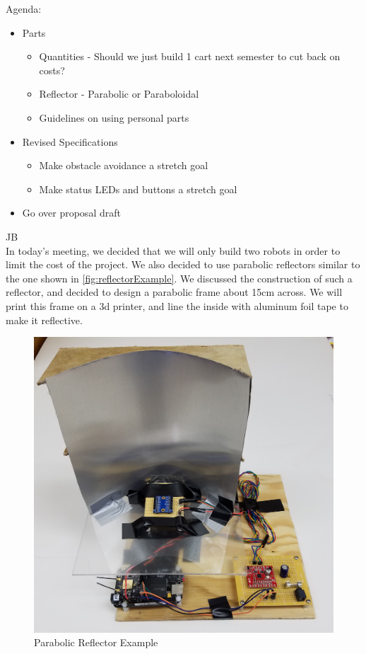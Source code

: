 \documentclass[fontsize=11pt, %
                             paper=letter, %
                             openany, %
                             captions=tableheading,
                             index=totoc,
                             hyperref]{labbook}
\begin{document}
\begin{addmargin}[0cm]{0cm}
Agenda: 
\begin{itemize}
    \item Parts
    \begin{itemize}
        \item Quantities - Should we just build 1 cart next semester to cut back on costs?
        \item Reflector - Parabolic or Paraboloidal
        \item Guidelines on using personal parts
    \end{itemize}
    \item Revised Specifications
    \begin{itemize}
        \item Make obstacle avoidance a stretch goal
        \item Make status LEDs and buttons a stretch goal
    \end{itemize}
    \item Go over proposal draft
\end{itemize}

JB\\
In today's meeting, we decided that we will only build two robots in order to limit the cost of the project. We also decided to use parabolic reflectors similar to the one shown in \autoref{fig:reflectorExample}. We discussed the construction of such a reflector, and decided to design a parabolic frame about 15cm across. We will print this frame on a 3d printer, and line the inside with aluminum foil tape to make it reflective.

\begin{figure}[h!]
    \centering
    \includegraphics[width=4.5in]{figs/img/customizedRadioTransceiver}
    \caption{Parabolic Reflector Example}
    \label{fig:reflectorExample}
\end{figure}


\end{addmargin}
\end{document}

